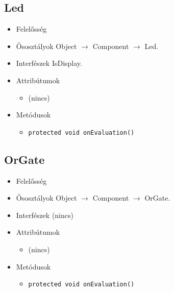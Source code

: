 \subsection{Led}
\begin{itemize}
\item Felelősség

\item Ősosztályok Object $\rightarrow{}$ Component $\rightarrow{}$ Led.
\item Interfészek IsDisplay.
\item Attribútumok $\ $
\begin{itemize}
\item (nincs)
\end{itemize}
\item Metódusok$\ $
\begin{itemize}
	\item \texttt{protected void onEvaluation()} 
\end{itemize}
\end{itemize}

\subsection{OrGate}
\begin{itemize}
\item Felelősség

\item Ősosztályok Object $\rightarrow{}$ Component $\rightarrow{}$ OrGate.
\item Interfészek (nincs)
\item Attribútumok $\ $
\begin{itemize}
\item (nincs)
\end{itemize}
\item Metódusok$\ $
\begin{itemize}
	\item \texttt{protected void onEvaluation()} 
\end{itemize}
\end{itemize}

